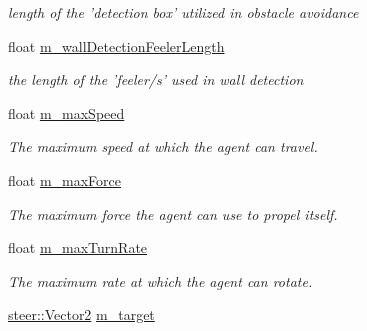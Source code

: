 \begin{DoxyCompactItemize}
\begin{DoxyCompactList}\small\item\em length of the 'detection box' utilized in obstacle avoidance \end{DoxyCompactList}\item 
\hypertarget{classsteer_1_1_agent_a4829d7657898902c398ab200ab07b020}{float \hyperlink{classsteer_1_1_agent_a4829d7657898902c398ab200ab07b020}{m\-\_\-wall\-Detection\-Feeler\-Length}}\label{classsteer_1_1_agent_a4829d7657898902c398ab200ab07b020}

\begin{DoxyCompactList}\small\item\em the length of the 'feeler/s' used in wall detection \end{DoxyCompactList}\item 
\hypertarget{classsteer_1_1_agent_aba01853b986d8386b82dc5cf4277237d}{float \hyperlink{classsteer_1_1_agent_aba01853b986d8386b82dc5cf4277237d}{m\-\_\-max\-Speed}}\label{classsteer_1_1_agent_aba01853b986d8386b82dc5cf4277237d}

\begin{DoxyCompactList}\small\item\em The maximum speed at which the agent can travel. \end{DoxyCompactList}\item 
\hypertarget{classsteer_1_1_agent_a907901caead6a63c29189ce837353603}{float \hyperlink{classsteer_1_1_agent_a907901caead6a63c29189ce837353603}{m\-\_\-max\-Force}}\label{classsteer_1_1_agent_a907901caead6a63c29189ce837353603}

\begin{DoxyCompactList}\small\item\em The maximum force the agent can use to propel itself. \end{DoxyCompactList}\item 
\hypertarget{classsteer_1_1_agent_a89547020b0796ffc7c184346788bab6d}{float \hyperlink{classsteer_1_1_agent_a89547020b0796ffc7c184346788bab6d}{m\-\_\-max\-Turn\-Rate}}\label{classsteer_1_1_agent_a89547020b0796ffc7c184346788bab6d}

\begin{DoxyCompactList}\small\item\em The maximum rate at which the agent can rotate. \end{DoxyCompactList}\item 
\hypertarget{classsteer_1_1_agent_a705eef01aa4f585256e185e140c2b032}{\hyperlink{structsteer_1_1_vector2}{steer\-::\-Vector2} \hyperlink{classsteer_1_1_agent_a705eef01aa4f585256e185e140c2b032}{m\-\_\-target}}\label{classsteer_1_1_agent_a705eef01aa4f585256e185e140c2b032}


\end{DoxyCompactItemize}
